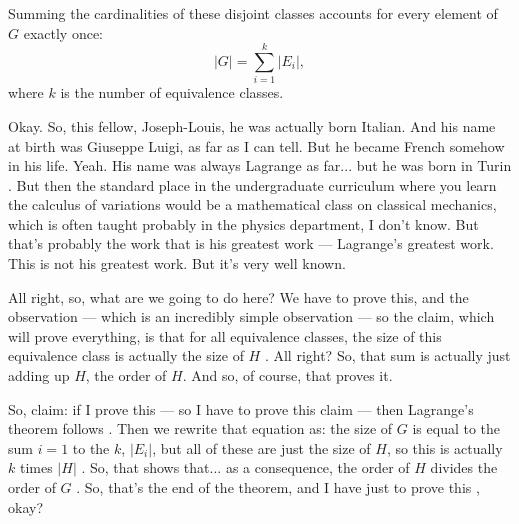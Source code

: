 \begin{proofWrapper}
\begin{content}
\begin{center}
\end{center}

Summing the cardinalities of these disjoint classes accounts for every element of $G$ exactly once:
\begin{equation}\label{eq:lagrange-sum-classes}
|G| = \sum_{i=1}^k |E_i|,
\end{equation}
where $k$ is the number of equivalence classes.
\end{content}

\begin{speech}[00:20:32 - 00:22:30]
Okay. So, this fellow, Joseph-Louis, he was actually born Italian. And his name at birth was Giuseppe Luigi, as far as I can tell. But he became French somehow in his life. Yeah. His name was always Lagrange as far... but he was born in Turin . But then the standard place in the undergraduate curriculum where you learn the calculus of variations would be a mathematical class on classical mechanics, which is often taught probably in the physics department, I don't know. But that's probably the work that is his greatest work --- Lagrange's greatest work. This is not his greatest work. But it's very well known.

All right, so, what are we going to do here? We have to prove this, and the observation --- which is an incredibly simple observation --- so the claim, which will prove everything, is that for all equivalence classes, the size of this equivalence class is actually the size of $H$ . All right? So, that sum is actually just adding up $H$, the order of $H$. And so, of course, that proves it.

So, claim: if I prove this --- so I have to prove this claim --- then Lagrange's theorem follows . Then we rewrite that equation as: the size of $G$ is equal to the sum $i = 1$ to the $k$, $|E_i|$, but all of these are just the size of $H$, so this is actually $k$ times $|H|$ . So, that shows that... as a consequence, the order of $H$ divides the order of $G$ . So, that's the end of the theorem, and I have just to prove this , okay?
\end{speech}


\end{proofWrapper}

